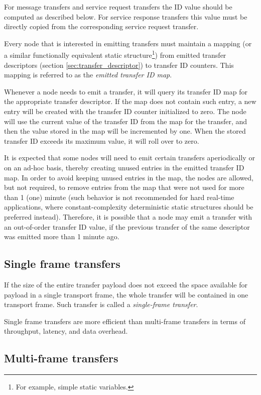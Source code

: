 For message transfers and service request transfers the ID value should be computed as described below.
For service response transfers this value must be directly copied from the corresponding service request transfer.

Every node that is interested in emitting transfers must maintain a mapping
(or a similar functionally equivalent static structure\footnote{For example, simple static variables.})
from emitted transfer descriptors (section \ref{sec:transfer_descriptor}) to transfer ID counters.
This mapping is referred to as the \emph{emitted transfer ID map}.

Whenever a node needs to emit a transfer, it will query its transfer ID map for the appropriate transfer descriptor.
If the map does not contain such entry, a new entry will be created with the transfer ID counter initialized to zero.
The node will use the current value of the transfer ID from the map for the transfer,
and then the value stored in the map will be incremented by one.
When the stored transfer ID exceeds its maximum value, it will roll over to zero.

It is expected that some nodes will need to emit certain transfers aperiodically or on an ad-hoc basis,
thereby creating unused entries in the emitted transfer ID map.
In order to avoid keeping unused entries in the map, the nodes are allowed, but not required,
to remove entries from the map that were not used for more than 1 (one) minute
(such behavior is not recommended for hard real-time applications, where constant-complexity deterministic
static structures should be preferred instead).
Therefore, it is possible that a node may emit a transfer with an out-of-order transfer ID value,
if the previous transfer of the same descriptor was emitted more than 1 minute ago.

\subsection{Single frame transfers}

If the size of the entire transfer payload does not exceed the space available for payload in a single transport frame,
the whole transfer will be contained in one transport frame.
Such transfer is called a \emph{single-frame transfer}.

Single frame transfers are more efficient than multi-frame transfers in terms of throughput, latency,
and data overhead.

\subsection{Multi-frame transfers}

